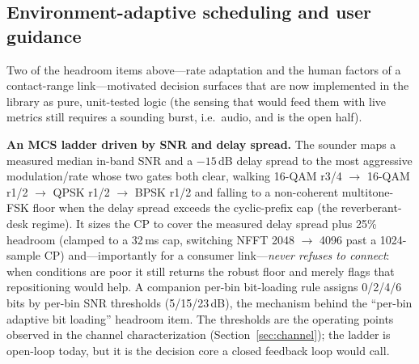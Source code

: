 \documentclass[11pt]{article}
\begin{document}
\subsection{Environment-adaptive scheduling and user guidance}
\label{sec:adaptive}

Two of the headroom items above---rate adaptation and the human factors of a
contact-range link---motivated decision surfaces that are now implemented in the
library as pure, unit-tested logic (the sensing that would feed them with live
metrics still requires a sounding burst, i.e.\ audio, and is the open half).

\textbf{An MCS ladder driven by SNR and delay spread.} The sounder maps a
measured median in-band SNR and a $-15$\,dB delay spread to the most aggressive
modulation/rate whose two gates both clear, walking 16-QAM r3/4 $\rightarrow$
16-QAM r1/2 $\rightarrow$ QPSK r1/2 $\rightarrow$ BPSK r1/2 and falling to a
non-coherent multitone-FSK floor when the delay spread exceeds the cyclic-prefix
cap (the reverberant-desk regime). It sizes the CP to cover the measured delay
spread plus 25\% headroom (clamped to a 32\,ms cap, switching NFFT 2048
$\rightarrow$ 4096 past a 1024-sample CP) and---importantly for a consumer
link---\emph{never refuses to connect}: when conditions are poor it still returns
the robust floor and merely flags that repositioning would help. A companion
per-bin bit-loading rule assigns 0/2/4/6 bits by per-bin SNR thresholds
(5/15/23\,dB), the mechanism behind the ``per-bin adaptive bit loading''
headroom item. The thresholds are the operating points observed in the channel
characterization (Section~\ref{sec:channel}); the ladder is open-loop today, but
it is the decision core a closed feedback loop would call.
\end{document}
